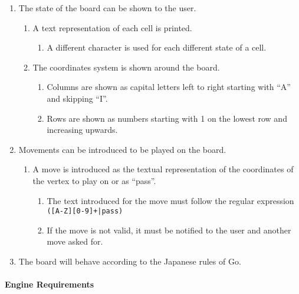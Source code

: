 \begin{enumerate}

	\item The state of the board can be shown to the user.
		\begin{enumerate}
			\item A text representation of each cell is printed.
				\begin{enumerate}
					\item A different character is used for each different state
						of a cell.
				\end{enumerate}
			\item The coordinates system is shown around the board.
				\begin{enumerate}
					\item Columns are shown as capital letters left to right
						starting with ``A'' and skipping ``I''.
					\item Rows are shown as numbers starting with 1 on the
						lowest row and increasing upwards.
				\end{enumerate}
		\end{enumerate}

	\item Movements can be introduced to be played on the board.
		\begin{enumerate}
			\item A move is introduced as the textual representation of the
				coordinates of the vertex to play on or as ``pass''.
				\begin{enumerate}
					\item The text introduced for the move must follow the
						regular expression \texttt{([A-Z][0-9]+|pass)}
					\item If the move is not valid, it must be notified to the
						user and another move asked for.
				\end{enumerate}
		\end{enumerate}

	\item The board will behave according to the Japanese rules of Go.

\end{enumerate}

\paragraph{Engine Requirements}


